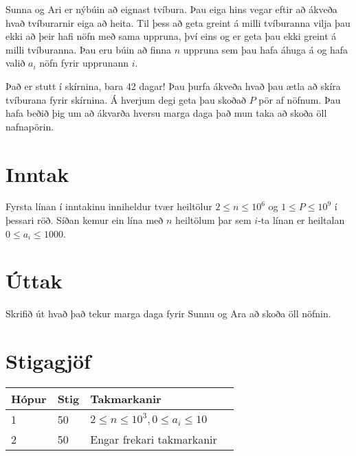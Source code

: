 Sunna og Ari er nýbúin að eignast tvíbura. Þau eiga hins vegar eftir að ákveða hvað
tvíburarnir eiga að heita. Til þess að geta greint á milli tvíburanna vilja þau ekki að þeir 
hafi nöfn með sama uppruna, því eins og er geta þau ekki greint á milli tvíburanna.
Þau eru búin að finna $n$ uppruna sem þau hafa áhuga á og hafa valið $a_i$ nöfn fyrir
upprunann $i$.

Það er stutt í skírnina, bara 42 dagar! Þau þurfa ákveða hvað þau ætla að skíra tvíburana
fyrir skírnina. Á hverjum degi geta þau skoðað $P$ pör af nöfnum. Þau hafa beðið þig um
að ákvarða hversu marga daga það mun taka að skoða öll nafnapörin.

\section*{Inntak}
Fyrsta línan í inntakinu inniheldur tvær heiltölur 
$2 \leq n \leq 10^6$ og
$1 \leq P \leq 10^9$ í þessari röð. Síðan kemur ein lína með $n$
heiltölum þar sem $i$-ta línan er heiltalan $0 \leq a_i \leq 1000$.

%
%

\section*{Úttak}
Skrifið út hvað það tekur marga daga fyrir Sunnu og Ara að skoða öll 
nöfnin.

\section*{Stigagjöf}
\begin{tabular}{|l|l|l|l|}
\hline
Hópur & Stig & Takmarkanir \\ \hline
1     & 50   & $2 \leq n \leq 10^3, 0 \leq a_i \leq 10$ \\ \hline
2     & 50   & Engar frekari takmarkanir\\ \hline
\end{tabular}

